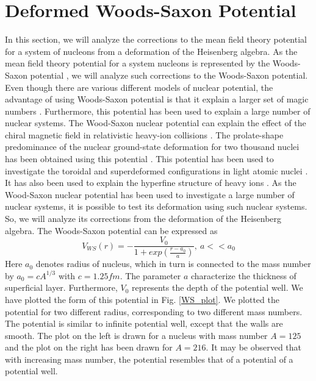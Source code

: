 \documentclass[12pt]{article}
\begin{document}
\section{ Deformed Woods-Saxon Potential}
 In this section, we will analyze the corrections to the  mean field theory  potential for a system of  nucleons from a deformation of the Heisenberg algebra. As the  mean field theory  potential for a system  nucleons is represented by the  Woods-Saxon potential \cite{wood, wood1, wood2, wood4, wood5}, we will analyze such corrections to the Woods-Saxon potential. Even though there are various different models of nuclear potential,  the advantage of using Woods-Saxon potential is that it explain a larger set of magic numbers \cite{wood, wood1, wood2, wood4, wood5}. Furthermore, this potential has been used to explain a large number of nuclear systems. The  Wood-Saxon nuclear potential can explain the effect of  the chiral magnetic field in relativistic heavy-ion collisions \cite{k1}. 
 The prolate-shape predominance of the nuclear ground-state deformation  for two thousand   nuclei 
 has been obtained using this potential \cite{k4}. 
 This potential has been used to investigate the toroidal and superdeformed configurations in light atomic nuclei  \cite{k5}. It has also been used to explain the hyperfine structure of heavy ions \cite{k6}. As the Wood-Saxon nuclear potential has been used to investigate a large number of nuclear systems,  it is possible to test its deformation using such nuclear systems. So, we  will analyze its corrections from the deformation of the Heisenberg algebra. The  Woods-Saxon  potential can be expressed as 
\cite{wood, wood1, wood2, wood4, wood5}
\begin{equation}\label{woods-saxon}
	V_{WS} (r) = - \frac{V_0}{1+ exp(\frac{r-a_0}{a})}, ~ a<<a_0
\end{equation}
Here  $a_0$ denotes radius of nucleus,  which in turn is connected to the mass number by $a_0  = c A^{1/3}$ with $c=1.25 fm$. The parameter $a$ characterize the thickness of superficial layer.  Furthermore, $V_0$   represents the depth of the  potential well.  
We have plotted  the form of this potential in Fig. \ref{WS_plot}. We plotted the potential for two  different radius, corresponding to two  different mass numbers. The potential is similar to infinite potential well, except that the  walls are smooth. The plot on the left is drawn for a nucleus with mass number $A = 125$ and the plot on the right has been drawn for $A = 216$. It may be observed that  with increasing mass number,  the potential resembles that of a potential of a potential well. 
 
\end{document}
